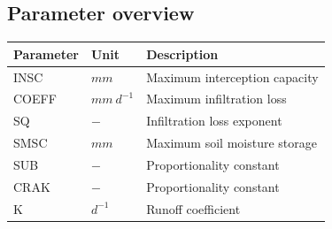 \subsection{Parameter overview}
\begin{table}[htbp]
  \centering
    \begin{tabular}{lll}
    \toprule
    Parameter & Unit  & Description \\
    \midrule
    INSC  & $mm$  & Maximum interception capacity \\
    COEFF & $mm~d^{-1}$ & Maximum infiltration loss \\
    SQ    & $-$   & Infiltration loss exponent \\
    SMSC  & $mm$  & Maximum soil moisture storage \\
    SUB   & $-$   & Proportionality constant \\
    CRAK  & $-$   & Proportionality constant \\
    K     & $d^{-1}$ & Runoff coefficient \\
    \bottomrule
    \end{tabular}%
  \label{tab:addlabel}%
\end{table}%



